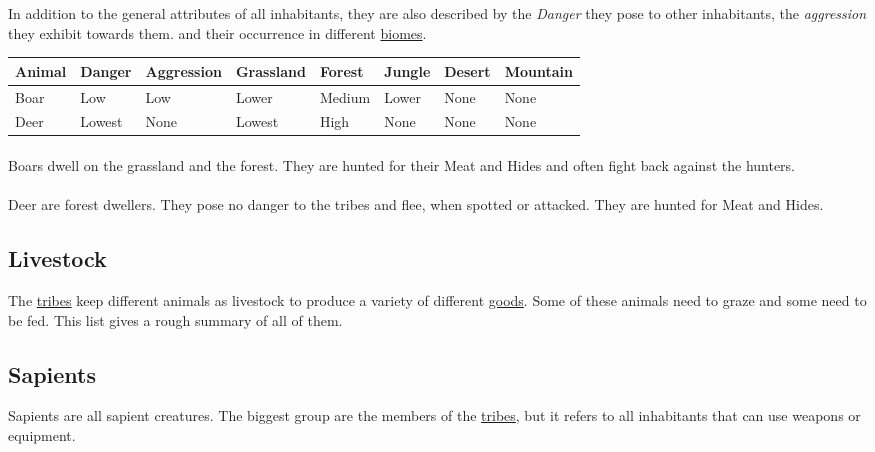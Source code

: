 In addition to the general attributes of all inhabitants, they are also
described by the \emph{Danger} they pose to other inhabitants, the
\emph{aggression} they exhibit towards them. and their occurrence in different
\hyperref[ch:World:Biomes]{biomes}.

\begin{longtable}{llllllll}
	\toprule
	Animal     & Danger & Aggression & \Gls{Grassland} & \Gls{Forest} & \Gls{Jungle} & \Gls{Desert} & \Gls{Mountain} \\
	\midrule
	\Gls{Boar} & Low    & Low        & Lower           & Medium       & Lower        & None         & None           \\
	\Gls{Deer} & Lowest & None       & Lowest          & High         & None         & None         & None           \\
	\bottomrule
\end{longtable}

\paragraph{}
\Glspl*{Boar} dwell on the grassland and the forest. They are hunted for their
\gls{Meat} and \glspl{Hide} and often fight back against the hunters.

\paragraph{}
\Gls{Deer} are forest dwellers. They pose no danger to the tribes and flee, when
spotted or attacked. They are hunted for \gls{Meat} and \glspl{Hide}.

\subsection{Livestock}\label{ch:World:Inhabitants:Livestock}

The \hyperref[ch:Tribes]{tribes} keep different animals as livestock to produce
a variety of different \hyperref[label]{goods}. Some of these animals need to
graze and some need to be fed. This list gives a rough summary of all of them.

\subsection{Sapients}\label{ch:World:Inhabitants:Sapients}

Sapients are all sapient creatures. The biggest group are the members of the
\hyperref[ch:Tribes]{tribes}, but it refers to all inhabitants that can use
weapons or equipment.

